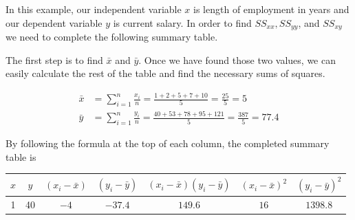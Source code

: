 \begin{example}
\begin{benumerate}
In this example, our independent variable $x$ is length of employment in years and our dependent variable $y$ is current salary. In order to find $SS_{xx}, SS_{yy}$, and $SS_{xy}$ we need to complete the following summary table.
\begin{center}
\end{center}
The first step is to find $\bar{x}$ and $\bar{y}$. Once we have found those two values, we can easily calculate the rest of the table and find the necessary sums of squares.

\begin{align*}
\bar{x} &= \sum_{i=1}^{n} \frac{x_i}{n} = \frac{1+2+5+7+10}{5} = \frac{25}{5} = 5\\
\bar{y} &= \sum_{i=1}^{n} \frac{y_i}{n} = \frac{40+53+78+95+121}{5} = \frac{387}{5} = 77.4
\end{align*}

By following the formula at the top of each column, the completed summary table is
\begin{center}  
\begin{tabular}{c|c|c|c|c|c|c} 
$x$ & $y$ & $(x_i - \bar{x})$ & $(y_i - \bar{y})$ & $(x_i - \bar{x})(y_i - \bar{y})$ & $(x_i-\bar{x})^2$ & $(y_i-\bar{y})^2$ \\ 
 \hline
1 & 40 & $-4$ & $-37.4$ & $149.6$ & $16$ & $1398.8$ \\ 


\end{tabular}
\end{center}
\end{benumerate}
\end{example}

